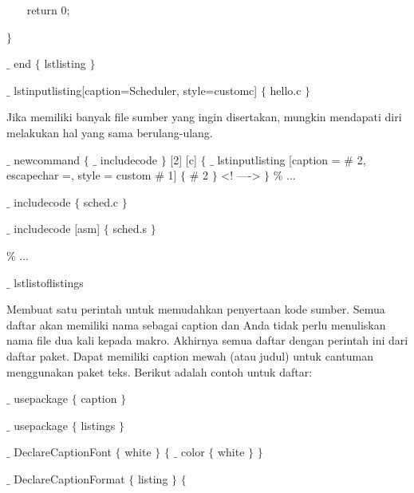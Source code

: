 {\fontsize{10pt}{10pt}\selectfont ~~~ return 0;}\par

{\fontsize{10pt}{10pt}\selectfont  $ \} $ }\par

{\fontsize{10pt}{10pt}\selectfont  $ \_ $ end $ \{ $ lstlisting $ \} $ }\par

{\fontsize{10pt}{10pt}\selectfont  $ \_ $ lstinputlisting[caption=Scheduler, style=customc] $ \{ $ hello.c $ \} $ }\par

\vspace{12pt}
\hspace{0.50in} Jika memiliki banyak file sumber yang ingin disertakan, mungkin mendapati diri melakukan hal yang sama berulang-ulang. 

$ \_ $  newcommand  $ \{ $  $ \_ $  includecode $ \} $  [2] [c]  $ \{ $  $ \_ $  lstinputlisting [caption =  $\#$  2, escapechar =, style = custom  $\#$  1]  $ \{ $  $\#$  2 $ \} $  <! ----> $ \} $  $\%$  ... 

$ \_ $  includecode  $ \{ $ sched.c $ \} $ 

$ \_ $  includecode [asm]  $ \{ $ sched.s $ \} $ 

$\%$  ... 

$ \_ $  lstlistoflistings

\vspace{12pt}
\hspace{0.50in} Membuat satu perintah untuk memudahkan penyertaan kode sumber. Semua daftar akan memiliki nama sebagai caption dan Anda tidak perlu menuliskan nama file dua kali kepada makro. Akhirnya semua daftar dengan perintah ini dari daftar paket. Dapat memiliki caption mewah (atau judul) untuk cantuman menggunakan paket teks. Berikut adalah contoh untuk daftar:\par

{\fontsize{10pt}{10pt}\selectfont  $ \_ $ usepackage $ \{ $ caption $ \} $ }\par

{\fontsize{10pt}{10pt}\selectfont  $ \_ $ usepackage $ \{ $ listings $ \} $ }\par

{\fontsize{10pt}{10pt}\selectfont  $ \_ $ DeclareCaptionFont $ \{ $ white $ \} $  $ \{ $   $ \_ $ color $ \{ $ white $ \} $   $ \} $ }\par

{\fontsize{10pt}{10pt}\selectfont  $ \_ $ DeclareCaptionFormat $ \{ $ listing $ \} $  $ \{ $ }\par

